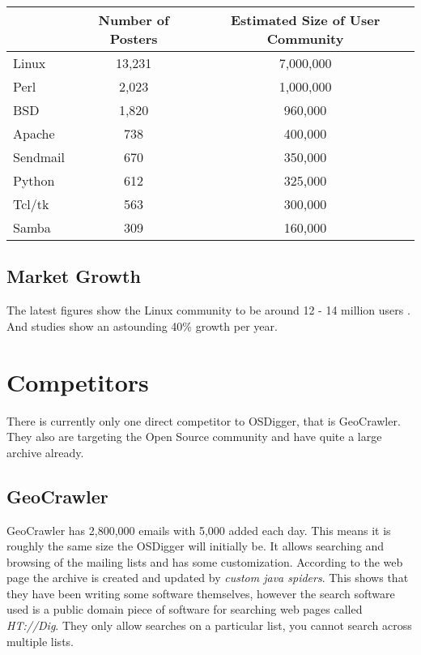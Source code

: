 \begin{center}
\begin{tabular}{|l|c|c|}
\hline
         & Number of Posters & Estimated Size of User Community \\
\hline
Linux    & 13,231  & 7,000,000  \\
Perl     & 2,023   & 1,000,000  \\
BSD      & 1,820   & 960,000    \\
Apache   & 738     & 400,000    \\
Sendmail & 670     & 350,000    \\
Python   & 612     & 325,000    \\
Tcl/tk   & 563     & 300,000    \\
Samba    & 309     & 160,000    \\
\hline
\end{tabular}
\end{center}

\subsection{Market Growth}

The latest figures show the Linux community to be around 12 - 14 million users \cite{www:lcp}. And studies show an astounding 40\% growth per year.

\section{Competitors}
There is currently only one direct competitor to OSDigger, that is GeoCrawler.  They also are targeting the Open Source community and have quite a large archive already.

\label{geocrawler}
\subsection{GeoCrawler}
GeoCrawler has 2,800,000 emails with 5,000 added each day.  This means it is roughly the same size the OSDigger will initially be.  It allows searching and browsing of the mailing lists and has some customization.  According to the web page the archive is created and updated by \emph{custom java spiders}.  This shows that they have been writing some software themselves, however the search software used is a public domain piece of software for searching web pages called \emph{HT://Dig}.  They only allow searches on a particular list, you cannot search across multiple lists.

